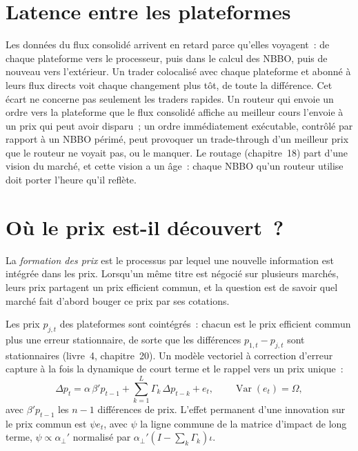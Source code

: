 \section{Latence entre les plateformes}

Les données du flux consolidé arrivent en retard parce qu'elles voyagent~: de chaque plateforme vers le processeur, puis dans le calcul des NBBO, puis de nouveau vers l'extérieur. Un trader
colocalisé avec chaque plateforme et abonné à leurs flux directs voit chaque changement plus tôt, de toute la différence. Cet écart ne concerne pas
seulement les traders rapides. Un routeur qui envoie un ordre vers la plateforme que le flux consolidé affiche au meilleur cours l'envoie à un prix qui peut
avoir disparu~; un ordre immédiatement exécutable, contrôlé par rapport à un NBBO périmé, peut provoquer un trade-through d'un meilleur prix que le routeur ne voyait pas, ou
le manquer. Le routage (chapitre~18) part d'une vision du marché, et cette vision a un âge~: chaque NBBO qu'un routeur utilise doit porter l'heure qu'il reflète.

\section{Où le prix est-il découvert~?}

\begin{definition}\label{def:mx:fragmentation-and-routing:discovery}
La \emph{formation des prix} est le processus par lequel une nouvelle information est intégrée dans les prix. Lorsqu'un même titre est négocié sur plusieurs
marchés, leurs prix partagent un prix efficient commun, et la question est de savoir quel marché fait d'abord bouger ce prix par ses cotations.
\end{definition}

Les prix $p_{j,t}$ des plateformes sont cointégrés~: chacun est le prix efficient commun plus une erreur stationnaire, de sorte que les différences $p_{1,t}-p_{j,t}$ sont
stationnaires (livre~4, chapitre~20). Un modèle vectoriel à correction d'erreur capture à la fois la dynamique de court terme et le rappel vers un prix unique~:
\[
\Delta p_t=\alpha\,\beta' p_{t-1}+\sum_{k=1}^{L}\Gamma_k\,\Delta p_{t-k}+e_t,\qquad \operatorname{Var}(e_t)=\Omega,
\]
avec $\beta'p_{t-1}$ les $n-1$ différences de prix. L'effet permanent d'une innovation sur le prix commun est $\psi e_t$, avec $\psi$ la ligne commune de la matrice
d'impact de long terme, $\psi\propto\alpha_\perp'$ normalisé par $\alpha_\perp'(I-\sum_k\Gamma_k)\iota$.


